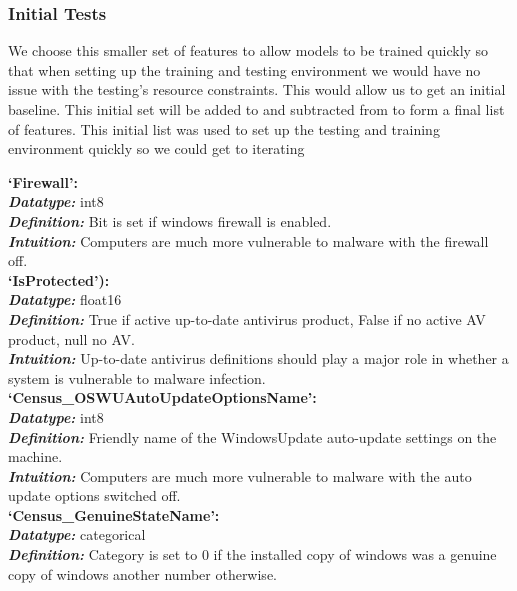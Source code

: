 \documentclass[sigconf]{acmart}
\begin{document}
\subsubsection{Initial Tests}
We choose this smaller set of features to allow models to be trained quickly so that when setting up the training and testing environment we would have no issue with the testing's resource constraints. This would allow us to get an initial baseline. This initial set will be added to and subtracted from to form a final list of features. This initial list was used to set up the testing and training environment quickly so we could get to iterating
\begin{center}
\textbf{`Firewall':}\\
    \textbf{\textit{Datatype: }}int8\\
    \textbf{\textit{Definition: }}Bit is set if windows firewall is enabled. \\
    \textbf{\textit{Intuition: }}Computers are much more vulnerable to malware with the firewall off.\\
    \vspace{5mm}
    \textbf{`IsProtected'):\\}
    \textbf{\textit{Datatype: }}float16\\
    \textbf{\textit{Definition: }}True if active up-to-date antivirus product, False if no active AV product, null no AV. \\
    \textbf{\textit{Intuition: }}Up-to-date antivirus definitions should play a major role in whether a system is vulnerable to malware infection.\\
    \vspace{5mm}
    \textbf{`Census\_OSWUAutoUpdateOptionsName':\\}
    \textbf{\textit{Datatype: }}int8\\
    \textbf{\textit{Definition: }}Friendly name of the WindowsUpdate auto-update settings on the machine. \\
    \textbf{\textit{Intuition: }}Computers are much more vulnerable to malware with the auto update options switched off.\\
    \vspace{5mm}
    \textbf{`Census\_GenuineStateName':\\}
    \textbf{\textit{Datatype: }}categorical\\
    \textbf{\textit{Definition: }}Category is set to 0 if the installed copy of windows was a genuine copy of windows another number otherwise.\\

\end{center}
\end{document}
